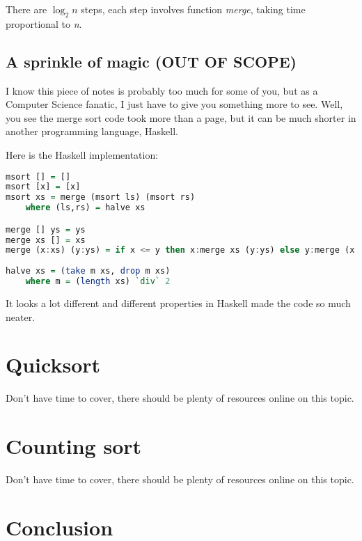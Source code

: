 There are $\log_2 n$ steps, each step involves function \textit{merge}, taking time proportional to \textit{n}.

\subsection*{A sprinkle of magic (OUT OF SCOPE)}

I know this piece of notes is probably too much for some of you, but as a Computer Science fanatic, I just have to give you something more to see. Well, you see the merge sort code took more than a page, but it can be much shorter in another programming language, Haskell. 

Here is the Haskell implementation:

\begin{lstlisting}[language=Haskell]
msort [] = []
msort [x] = [x]
msort xs = merge (msort ls) (msort rs)
    where (ls,rs) = halve xs

merge [] ys = ys
merge xs [] = xs
merge (x:xs) (y:ys) = if x <= y then x:merge xs (y:ys) else y:merge (x:xs) ys
    
halve xs = (take m xs, drop m xs)
    where m = (length xs) `div` 2

\end{lstlisting}

It looks a lot different and different properties in Haskell made the code so much neater.

\section{Quicksort}

Don't have time to cover, there should be plenty of resources online on this topic.

\section{Counting sort}

Don't have time to cover, there should be plenty of resources online on this topic.

\section{Conclusion}

